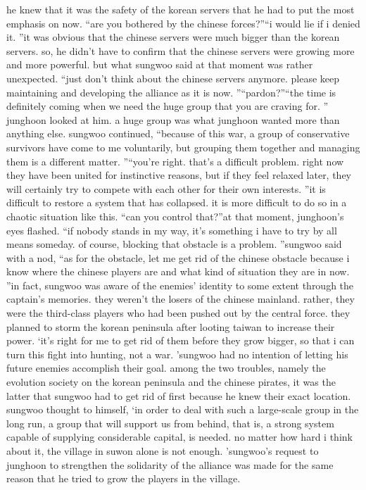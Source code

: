  he knew that it was the safety of the korean servers that he had to put the most emphasis on now.
“are you bothered by the chinese forces?”“i would lie if i denied it.
”it was obvious that the chinese servers were much bigger than the korean servers.
 so, he didn’t have to confirm that the chinese servers were growing more and more powerful.
but what sungwoo said at that moment was rather unexpected.
“just don’t think about the chinese servers anymore.
 please keep maintaining and developing the alliance as it is now.
”“pardon?”“the time is definitely coming when we need the huge group that you are craving for.
”
junghoon looked at him.
 a huge group was what junghoon wanted more than anything else.
sungwoo continued, “because of this war, a group of conservative survivors have come to me voluntarily, but grouping them together and managing them is a different matter.
”“you’re right.
 that’s a difficult problem.
 right now they have been united for instinctive reasons, but if they feel relaxed later, they will certainly try to compete with each other for their own interests.
”it is difficult to restore a system that has collapsed.
 it is more difficult to do so in a chaotic situation like this.
“can you control that?”at that moment, junghoon’s eyes flashed.
“if nobody stands in my way, it’s something i have to try by all means someday.
 of course, blocking that obstacle is a problem.
”sungwoo said with a nod, “as for the obstacle, let me get rid of the chinese obstacle because i know where the chinese players are and what kind of situation they are in now.
”in fact, sungwoo was aware of the enemies’ identity to some extent through the captain’s memories.
they weren’t the losers of the chinese mainland.
 rather, they were the third-class players who had been pushed out by the central force.
 they planned to storm the korean peninsula after looting taiwan to increase their power.
‘it’s right for me to get rid of them before they grow bigger, so that i can turn this fight into hunting, not a war.
’sungwoo had no intention of letting his future enemies accomplish their goal.
among the two troubles, namely the evolution society on the korean peninsula and the chinese pirates, it was the latter that sungwoo had to get rid of first because he knew their exact location.
sungwoo thought to himself, ‘in order to deal with such a large-scale group in the long run, a group that will support us from behind, that is, a strong system capable of supplying considerable capital, is needed.
 no matter how hard i think about it, the village in suwon alone is not enough.
’sungwoo’s request to junghoon to strengthen the solidarity of the alliance was made for the same reason that he tried to grow the players in the village.
